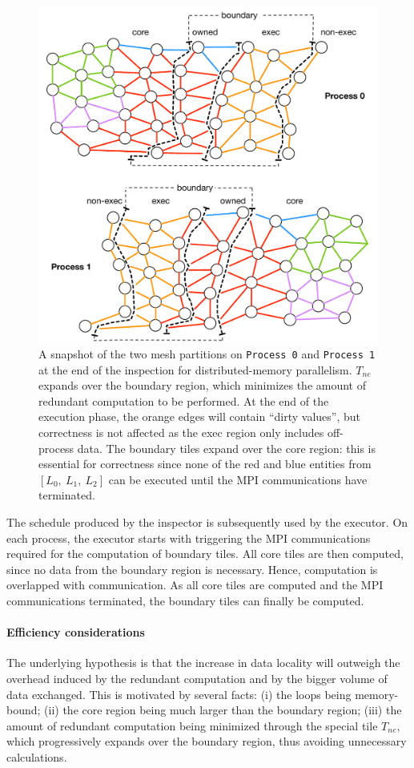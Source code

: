 \begin{figure}[thpb]
\centering
\includegraphics[scale=0.6]{sparsetiling/figures/mpi_loop2.pdf}
\caption{A snapshot of the two mesh partitions on {\tt Process 0} and {\tt Process 1} at the end of the inspection for distributed-memory parallelism. $T_{ne}$ expands over the boundary region, which minimizes the amount of redundant computation to be performed. At the end of the execution phase, the orange edges will contain ``dirty  values'', but correctness is not affected as the exec region only includes off-process data. The boundary tiles expand over the core region: this is essential for correctness since none of the red and blue entities from $[L_0,\ L_1,\ L_2]$ can be executed until the MPI communications have terminated.}
\label{fig:st-mpi-growth}
\end{figure}

The schedule produced by the inspector is subsequently used by the executor. On each process, the executor starts with triggering the MPI communications required for the computation of boundary tiles. All core tiles are then computed, since no data from the boundary region is necessary. Hence, computation is overlapped with communication. As all core tiles are computed and the MPI communications terminated, the boundary tiles can finally be computed.

\paragraph{Efficiency considerations}
The underlying hypothesis is that the increase in data locality will outweigh the overhead induced by the redundant computation and by the bigger volume of data exchanged. This is motivated by several facts: (i) the loops being memory-bound;  (ii) the core region being much larger than the boundary region; (iii) the amount of redundant computation being minimized through the special tile $T_{ne}$, which progressively expands over the boundary region, thus avoiding unnecessary calculations.


